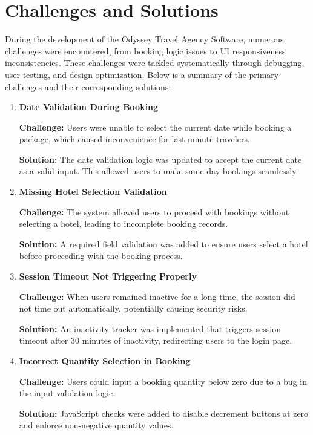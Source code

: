 \section{Challenges and Solutions}
During the development of the Odyssey Travel Agency Software, numerous challenges were encountered, from booking logic issues to UI responsiveness inconsistencies. These challenges were tackled systematically through debugging, user testing, and design optimization. Below is a summary of the primary challenges and their corresponding solutions:

\begin{enumerate}
    \item \textbf{Date Validation During Booking}
    
    \textbf{Challenge:} Users were unable to select the current date while booking a package, which caused inconvenience for last-minute travelers.

    \textbf{Solution:} The date validation logic was updated to accept the current date as a valid input. This allowed users to make same-day bookings seamlessly.

    \item \textbf{Missing Hotel Selection Validation}
    
    \textbf{Challenge:} The system allowed users to proceed with bookings without selecting a hotel, leading to incomplete booking records.

    \textbf{Solution:} A required field validation was added to ensure users select a hotel before proceeding with the booking process.

    \item \textbf{Session Timeout Not Triggering Properly}
    
    \textbf{Challenge:} When users remained inactive for a long time, the session did not time out automatically, potentially causing security risks.

    \textbf{Solution:} An inactivity tracker was implemented that triggers session timeout after 30 minutes of inactivity, redirecting users to the login page.

    \item \textbf{Incorrect Quantity Selection in Booking}
    
    \textbf{Challenge:} Users could input a booking quantity below zero due to a bug in the input validation logic.

    \textbf{Solution:} JavaScript checks were added to disable decrement buttons at zero and enforce non-negative quantity values.


\end{enumerate}
